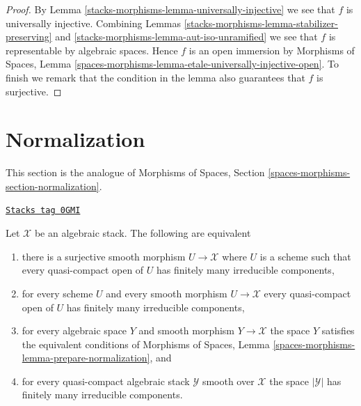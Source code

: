 \begin{proof}
By Lemma \ref{stacks-morphisms-lemma-universally-injective} we see that $f$ is
universally injective. Combining
Lemmas \ref{stacks-morphisms-lemma-stabilizer-preserving} and
\ref{stacks-morphisms-lemma-aut-iso-unramified}
we see that $f$ is representable by algebraic spaces.
Hence $f$ is an open immersion by Morphisms of Spaces, Lemma
\ref{spaces-morphisms-lemma-etale-universally-injective-open}.
To finish we remark that the condition in the lemma also guarantees
that $f$ is surjective.
\end{proof}

\section{Normalization}
\label{stacks-morphisms-section-normalization}
This section is the analogue of
Morphisms of Spaces, Section \ref{spaces-morphisms-section-normalization}.

\begin{lemma}
\label{stacks-morphisms-lemma-prepare-normalization}
\href{https://stacks.math.columbia.edu/tag/0GMI}{\texttt{Stacks tag 0GMI}}

Let $\mathcal{X}$ be an algebraic stack. The following are equivalent
\begin{enumerate}
\item there is a surjective smooth morphism $U \to \mathcal{X}$ where $U$
is a scheme such that every quasi-compact open of $U$ has
finitely many irreducible components,
\item for every scheme $U$ and every smooth morphism
$U \to \mathcal{X}$ every quasi-compact open of $U$ has finitely many
irreducible components,
\item for every algebraic space $Y$ and smooth morphism $Y \to \mathcal{X}$
the space $Y$ satisfies the equivalent conditions of
Morphisms of Spaces, Lemma \ref{spaces-morphisms-lemma-prepare-normalization},
and
\item for every quasi-compact algebraic stack $\mathcal{Y}$ smooth over
$\mathcal{X}$ the space $|\mathcal{Y}|$ has finitely many irreducible
components.
\end{enumerate}
\end{lemma}

